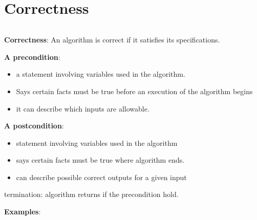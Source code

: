 \documentclass[
]{article}
\author{}
\date{}
\begin{document}
\hypertarget{correctness}{%
\section{Correctness}\label{correctness}}

\(\newcommand{\A}{\mathcal{A}}\)

\textbf{Correctness}: An algorithm is correct if it satisfies its
specifications.

\textbf{A precondition}:

\begin{itemize}
\item
  a statement involving variables used in the algorithm.
\item
  Says certain facts must be true before an execution of the algorithm
  begins
\item
  it can describe which inputs are allowable.
\end{itemize}

\textbf{A postcondition}:

\begin{itemize}
\item
  statement involving variables used in the algorithm
\item
  says certain facts must be true where algorithm ends.
\item
  can describe possible correct outputs for a given input
\end{itemize}

termination: algorithm returns if the precondition hold.

\textbf{Examples}:
\end{document}
